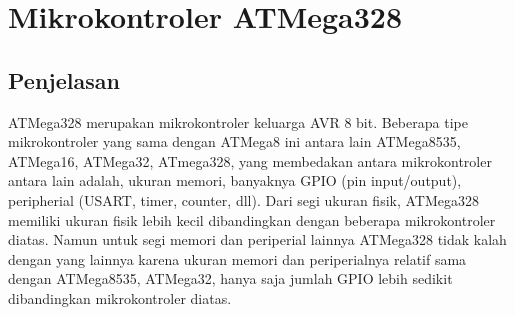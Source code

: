 \section{Mikrokontroler ATMega328}
	\subsection{Penjelasan}
	ATMega328 merupakan mikrokontroler keluarga AVR 8 bit. Beberapa tipe mikrokontroler yang sama dengan ATMega8 ini antara lain ATMega8535, ATMega16, ATMega32, ATmega328, yang membedakan antara mikrokontroler antara lain adalah, ukuran memori, banyaknya GPIO (pin input/output), peripherial (USART, timer, counter, dll). Dari segi ukuran fisik, ATMega328 memiliki ukuran fisik lebih kecil dibandingkan dengan beberapa mikrokontroler diatas. Namun untuk segi memori dan periperial lainnya ATMega328 tidak kalah dengan yang lainnya karena ukuran memori dan periperialnya relatif sama dengan ATMega8535, ATMega32, hanya saja jumlah GPIO lebih sedikit dibandingkan mikrokontroler diatas.

